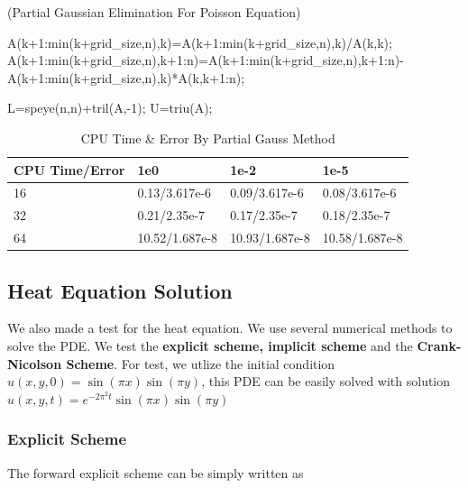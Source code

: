 \documentclass[12pt]{amsart}
\begin{document}
\begin{algorithm}[h]
	\caption{(Partial Gaussian Elimination For Poisson Equation)} 
	
	\begin{algorithmic}[1]
		
		
		
		\State A(k+1:min(k+grid\_size,n),k)=A(k+1:min(k+grid\_size,n),k)/A(k,k);
		\State A(k+1:min(k+grid\_size,n),k+1:n)=A(k+1:min(k+grid\_size,n),k+1:n)-A(k+1:min(k+grid\_size,n),k)*A(k,k+1:n);
	
		\EndFor
		\State L=speye(n,n)+tril(A,-1);
		\State U=triu(A);
	
		\State \Return [L, U]
	\end{algorithmic}
\end{algorithm}


\begin{table}[h]
	\centering
	\caption{CPU Time \& Error By Partial Gauss Method}
	\label{gauss}
	\begin{tabular}{|l|lll|}
		\hline
		CPU Time/Error & 1e0            & 1e-2           & 1e-5           \\ \hline\hline
		16             & 0.13/3.617e-6  & 0.09/3.617e-6  & 0.08/3.617e-6  \\ \hline
		32             & 0.21/2.35e-7   & 0.17/2.35e-7   & 0.18/2.35e-7   \\ \hline
		64             & 10.52/1.687e-8 & 10.93/1.687e-8 & 10.58/1.687e-8 \\ \hline\hline
	\end{tabular}
\end{table}






\subsection{Heat Equation Solution}

We also made a test for the heat equation. We use several numerical methods to solve the PDE. We test the \textbf{explicit scheme, implicit scheme} and the \textbf{Crank-Nicolson Scheme}. For test, we utlize the initial condition $u(x,y,0)=\sin(\pi x)\sin(\pi y)$, this PDE can be easily solved with solution $u(x,y,t)=e^{-2\pi^2t}\sin(\pi x)\sin(\pi y)$

\subsubsection{Explicit Scheme} The forward explicit scheme can be simply written as
\end{document}
